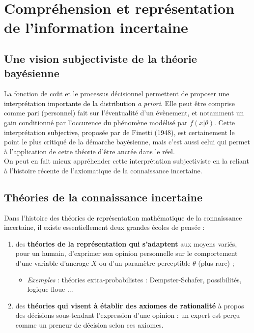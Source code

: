 \section{Compréhension et représentation de l'information incertaine}\label{representation}

\subsection{Une vision subjectiviste de la théorie bayésienne}

La fonction de co\^ut et le processus décisionnel permettent de proposer une \textcolor{black}{interprétation importante de la distribution {\it a priori}}. Elle peut \^etre comprise comme \textcolor{black}{pari} (personnel) fait sur l'éventualité d'un évènement, et notamment un gain conditionné par l'occurence du phénomène modélisé par $f(x|\theta)$. Cette interprétation \textcolor{black}{subjective}, proposée par de Finetti (1948), est certainement le point le plus critiqué de la démarche bayésienne, mais c'est aussi celui qui permet à l'application de cette théorie d'être ancrée dans le réel. \\

On peut en fait mieux appréhender cette interprétation subjectiviste en la reliant à l'histoire récente de l'axiomatique de la connaissance incertaine. 

\subsection{Théories de la connaissance incertaine}

Dans l'histoire des \textcolor{black}{théories de représentation mathématique de la connaissance incertaine}, il existe essentiellement deux grandes écoles de pensée :
\begin{enumerate}
\item des \textbf{théories de la représentation qui s'adaptent} aux moyens variés, pour un humain, d'exprimer son opinion personnelle sur le comportement d'une \textcolor{black}{variable d'ancrage} $X$ ou d'un paramètre perceptible $\theta$ (plus rare) ; 
\begin{itemize}
\item \emph{Exemples} : {théories extra-probabilistes : Dempster-Schafer, possibilités, logique floue ...} 
\end{itemize} 
\item des \textbf{théories qui visent à établir des \textcolor{black}{axiomes de rationalité}} à propos des décisions sous-tendant l'expression d'une opinion : un expert est per\c cu comme un \textcolor{black}{preneur de décision} selon ces axiomes.
\end{enumerate}

